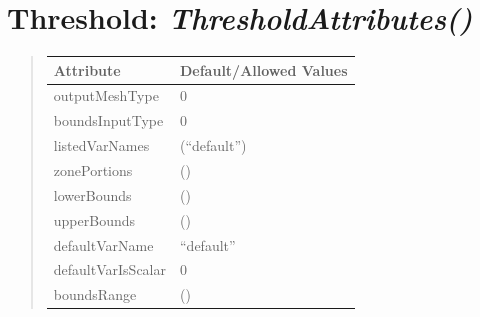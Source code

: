 \documentclass[letterpaper,10pt,english]{sphinxmanual}
\begin{document}
\begin{DUlineblock}{0em}
\item[] 
\end{DUlineblock}

\begin{DUlineblock}{0em}
\item[] 
\end{DUlineblock}


\section{\textbf{Threshold}: \emph{ThresholdAttributes()}}
\label{attributes:threshold-thresholdattributes}
\begin{DUlineblock}{0em}
\item[] 
\end{DUlineblock}
\begin{quote}

\begin{tabulary}{\linewidth}{|L|L|}
\hline

\textbf{Attribute}
 & 
\textbf{Default/Allowed Values}
\\
\hline
outputMeshType
 & 
0
\\
\hline
boundsInputType
 & 
0
\\
\hline
listedVarNames
 & 
(``default'')
\\
\hline
zonePortions
 & 
()
\\
\hline
lowerBounds
 & 
()
\\
\hline
upperBounds
 & 
()
\\
\hline
defaultVarName
 & 
``default''
\\
\hline
defaultVarIsScalar
 & 
0
\\
\hline
boundsRange
 & 
()
\\
\hline\end{tabulary}

\end{quote}

\begin{DUlineblock}{0em}
\item[] 
\end{DUlineblock}

\begin{DUlineblock}{0em}
\item[] 
\end{DUlineblock}
\end{document}
